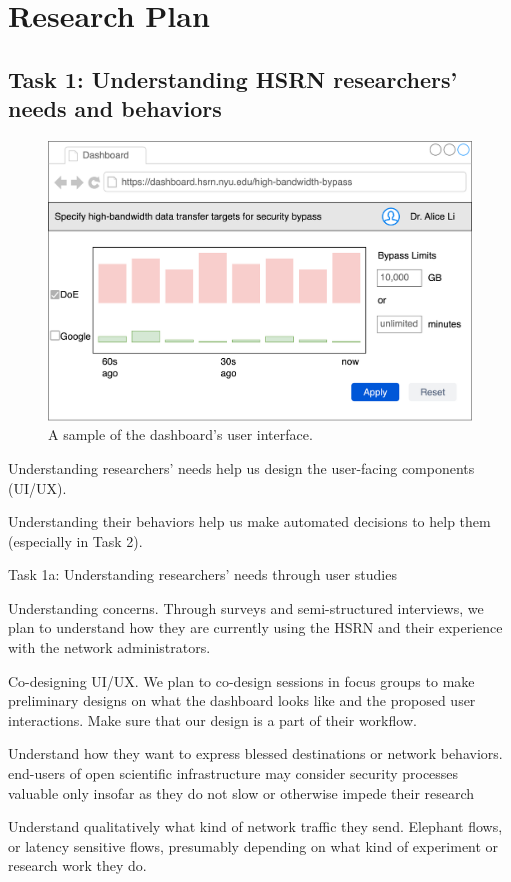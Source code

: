 \section{Research Plan}

\subsection{Task 1: Understanding HSRN researchers' needs and behaviors}

\begin{figure}[t]
    \centering
    \includegraphics[width=0.5\linewidth]{figures/dashboard.png}
    \caption{A sample of the dashboard's user interface.}
    \label{fig:dashboard}
\end{figure}


Understanding researchers' needs help us design the user-facing components (UI/UX).

Understanding their behaviors help us make automated decisions to help them (especially in Task 2).

Task 1a: Understanding researchers' needs through user studies

Understanding concerns. Through surveys and semi-structured interviews, we plan to understand how they are currently using the HSRN and their experience with the network administrators.

Co-designing UI/UX. We plan to co-design sessions in focus groups to make preliminary designs on what the dashboard looks like and the proposed user interactions. Make sure that our design is a part of their workflow.

Understand how they want to express blessed destinations or network behaviors. end-users of open scientific infrastructure may consider security processes valuable only insofar as they do not slow or otherwise impede their research

Understand qualitatively what kind of network traffic they send. Elephant flows, or latency sensitive flows, presumably depending on what kind of experiment or research work they do.


